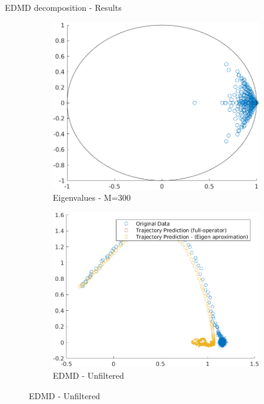 \documentclass{beamer}
\begin{document}
\begin{frame}{EDMD decomposition - Results}
    \begin{figure}
        \centering
        \begin{subfigure}[b]{0.3\textwidth}
            \centering
            \includegraphics[width=\textwidth]{EDMD_Ref.png}
            \caption{Eigenvalues - M=300}
            \label{fig:EDMD_Ref}
        \end{subfigure}
        \begin{subfigure}[b]{0.3\textwidth}
            \centering
            \includegraphics[width=\textwidth]{EDMD_00.png}
            \caption{EDMD - Unfiltered}

\end{subfigure}
\end{figure}
\end{frame}
\end{document}
